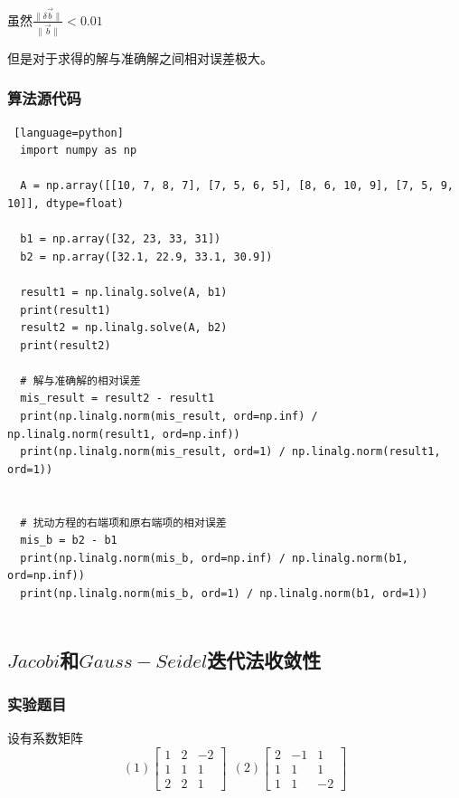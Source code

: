 \documentclass[UTF8]{ctexart}
\begin{document}
虽然$\frac{\|\delta \vec{b}\|}{\|\vec{b}\|} < 0.01$

但是对于求得的解与准确解之间相对误差极大。
\subsubsection{算法源代码}
\begin{lstlisting} [language=python]
  import numpy as np

  A = np.array([[10, 7, 8, 7], [7, 5, 6, 5], [8, 6, 10, 9], [7, 5, 9, 10]], dtype=float)
  
  b1 = np.array([32, 23, 33, 31])
  b2 = np.array([32.1, 22.9, 33.1, 30.9])
  
  result1 = np.linalg.solve(A, b1)
  print(result1)
  result2 = np.linalg.solve(A, b2)
  print(result2)
  
  # 解与准确解的相对误差
  mis_result = result2 - result1
  print(np.linalg.norm(mis_result, ord=np.inf) / np.linalg.norm(result1, ord=np.inf))
  print(np.linalg.norm(mis_result, ord=1) / np.linalg.norm(result1, ord=1))
  
  
  # 扰动方程的右端项和原右端项的相对误差
  mis_b = b2 - b1
  print(np.linalg.norm(mis_b, ord=np.inf) / np.linalg.norm(b1, ord=np.inf))
  print(np.linalg.norm(mis_b, ord=1) / np.linalg.norm(b1, ord=1))
  
\end{lstlisting}

\subsection{$Jacobi$和$Gauss-Seidel$迭代法收敛性}
\subsubsection{实验题目}
设有系数矩阵
\begin{equation}\nonumber
        (1)\left[\begin{array}{ccc}
            1 & 2 & -2 \\
            1 & 1 & 1 \\
            2 & 2 & 1
            \end{array}\right]
        ~~
        (2)\left[\begin{array}{ccc}
            2 & -1 & 1 \\
            1 & 1 & 1 \\
            1 & 1 & -2
            \end{array}\right]
\end{equation}
\end{document}
